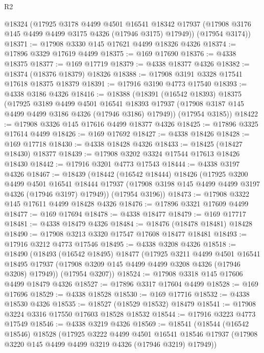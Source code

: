 \begin{lexlean}{R2}
\begin{coremodule}
      @18324
      (@17925
        @3178
        @4499
        @4501
        @16541
        @18342
        @17937
        (@17908 @3176 @145 @4499 @4499 @3175 @4326 (@17946 @3175) @17949))
      (@17954 @3174))
@18371 := @17908 @3330 @145 @17621 @4499 @18326 @4326
@18374 := @17896 @3329 @17619 @4499
@18375 := @169 @17690
@18376 := @4338 @18375
@18377 := @169 @17719
@18379 := @4338 @18377 @4326
@18382 := @18374 (@18376 @18379) @18326
@18388 := @17908 @3191 @3328 @17541 @17618 @18375 @18379
@18391 := @17916 @3190 @4773 @17540
@18393 := @4338 @3186 @4326
@18416 := @18388
    (@18391
      (@16542 @18393)
      @18375
      (@17925
        @3189
        @4499
        @4501
        @16541
        @18393
        @17937
        (@17908 @3187 @145 @4499 @4499 @3186 @4326 (@17946 @3186) @17949))
      (@17954 @3185))
@18422 := @17908 @3326 @145 @17616 @4499 @18377 @4326
@18425 := @17896 @3325 @17614 @4499
@18426 := @169 @17692
@18427 := @4338 @18426
@18428 := @169 @17718
@18430 := @4338 @18428 @4326
@18433 := @18425 (@18427 @18430) @18377
@18439 := @17908 @3202 @3324 @17544 @17613 @18426 @18430
@18442 := @17916 @3201 @4773 @17543
@18444 := @4338 @3197 @4326
@18467 := @18439
    (@18442
      (@16542 @18444)
      @18426
      (@17925
        @3200
        @4499
        @4501
        @16541
        @18444
        @17937
        (@17908 @3198 @145 @4499 @4499 @3197 @4326 (@17946 @3197) @17949))
      (@17954 @3196))
@18473 := @17908 @3322 @145 @17611 @4499 @18428 @4326
@18476 := @17896 @3321 @17609 @4499
@18477 := @169 @17694
@18478 := @4338 @18477
@18479 := @169 @17717
@18481 := @4338 @18479 @4326
@18484 := @18476 (@18478 @18481) @18428
@18490 := @17908 @3213 @3320 @17547 @17608 @18477 @18481
@18493 := @17916 @3212 @4773 @17546
@18495 := @4338 @3208 @4326
@18518 := @18490
    (@18493
      (@16542 @18495)
      @18477
      (@17925
        @3211
        @4499
        @4501
        @16541
        @18495
        @17937
        (@17908 @3209 @145 @4499 @4499 @3208 @4326 (@17946 @3208) @17949))
      (@17954 @3207))
@18524 := @17908 @3318 @145 @17606 @4499 @18479 @4326
@18527 := @17896 @3317 @17604 @4499
@18528 := @169 @17696
@18529 := @4338 @18528
@18530 := @169 @17716
@18532 := @4338 @18530 @4326
@18535 := @18527 (@18529 @18532) @18479
@18541 := @17908 @3224 @3316 @17550 @17603 @18528 @18532
@18544 := @17916 @3223 @4773 @17549
@18546 := @4338 @3219 @4326
@18569 := @18541
    (@18544
      (@16542 @18546)
      @18528
      (@17925
        @3222
        @4499
        @4501
        @16541
        @18546
        @17937
        (@17908 @3220 @145 @4499 @4499 @3219 @4326 (@17946 @3219) @17949))

\end{coremodule}
\end{lexlean}
